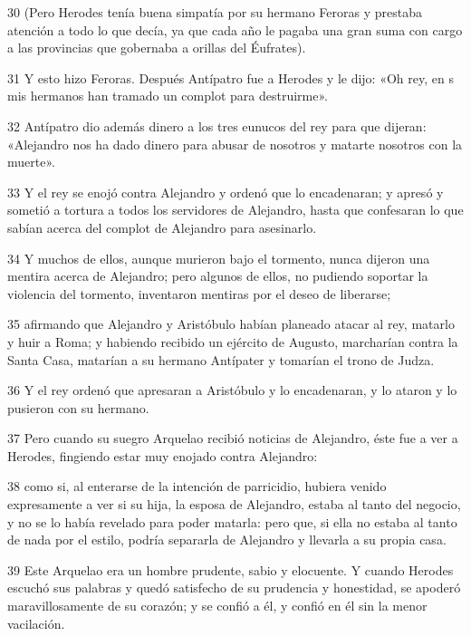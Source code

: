 \par 30 (Pero Herodes tenía buena simpatía por su hermano Feroras y prestaba atención a todo lo que decía, ya que cada año le pagaba una gran suma con cargo a las provincias que gobernaba a orillas del Éufrates).

\par 31 Y esto hizo Feroras. Después Antípatro fue a Herodes y le dijo: «Oh rey, en s mis hermanos han tramado un complot para destruirme».

\par 32 Antípatro dio además dinero a los tres eunucos del rey para que dijeran: «Alejandro nos ha dado dinero para abusar de nosotros y matarte nosotros con la muerte».

\par 33 Y el rey se enojó contra Alejandro y ordenó que lo encadenaran; y apresó y sometió a tortura a todos los servidores de Alejandro, hasta que confesaran lo que sabían acerca del complot de Alejandro para asesinarlo.

\par 34 Y muchos de ellos, aunque murieron bajo el tormento, nunca dijeron una mentira acerca de Alejandro; pero algunos de ellos, no pudiendo soportar la violencia del tormento, inventaron mentiras por el deseo de liberarse;

\par 35 afirmando que Alejandro y Aristóbulo habían planeado atacar al rey, matarlo y huir a Roma; y habiendo recibido un ejército de Augusto, marcharían contra la Santa Casa, matarían a su hermano Antípater y tomarían el trono de Judza.

\par 36 Y el rey ordenó que apresaran a Aristóbulo y lo encadenaran, y lo ataron y lo pusieron con su hermano.

\par 37 Pero cuando su suegro Arquelao recibió noticias de Alejandro, éste fue a ver a Herodes, fingiendo estar muy enojado contra Alejandro:


\par 38 como si, al enterarse de la intención de parricidio, hubiera venido expresamente a ver si su hija, la esposa de Alejandro, estaba al tanto del negocio, y no se lo había revelado para poder matarla: pero que, si ella no estaba al tanto de nada por el estilo, podría separarla de Alejandro y llevarla a su propia casa.

\par 39 Este Arquelao era un hombre prudente, sabio y elocuente. Y cuando Herodes escuchó sus palabras y quedó satisfecho de su prudencia y honestidad, se apoderó maravillosamente de su corazón; y se confió a él, y confió en él sin la menor vacilación.

